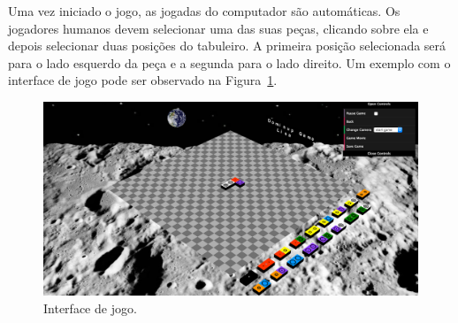 \documentclass[a4paper]{article}
\begin{document}
Uma vez iniciado o jogo, as jogadas do computador são automáticas. Os jogadores humanos devem selecionar uma das suas peças, clicando sobre ela e depois selecionar duas posições do tabuleiro. A primeira posição selecionada será para o lado esquerdo da peça e a segunda para o lado direito. Um exemplo com o interface de jogo pode ser observado na Figura~\ref{interface}.

\begin{figure}[htbp]
\begin{center}
\includegraphics[scale=0.3]{game.png}
\caption{Interface de jogo.}
\label{interface}
\end{center}
\end{figure}
\end{document}
